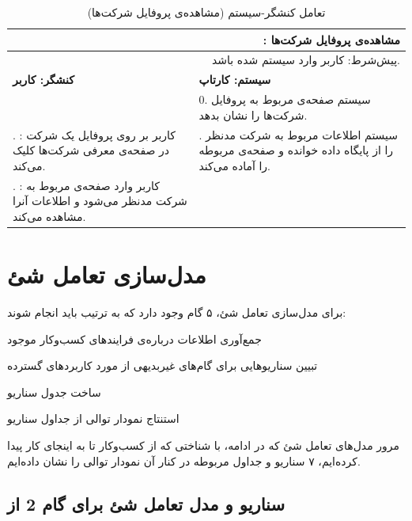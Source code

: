 \documentclass[12pt,svgnames,oneside]{book}
\newcounter{itemadded}
\let\LaTeXStandardEnumerateBegin\enumerate
\let\LaTeXStandardEnumerateEnd\endenumerate
\renewenvironment{enumerate}{%
\LaTeXStandardEnumerateBegin%
\setcounter{itemadded}{0}
}{%
\LaTeXStandardEnumerateEnd%
}%
\newcommand{\uc}[1]{\lr{UC{#1}}}
\newcommand{\tucbw}{\lr{TUCBW}}
\newcommand{\tucew}{\lr{TUCEW}}
\newcommand{\actorsystem}[1]{
\textbf{کنشگر: {#1}} &
\textbf{سیستم: کارتاپ} \\
}
\newcommand{\zerostep}[1]{
& 0. {#1} \\
}
\newcounter{UseCaseCounter}
\newcommand{\step}[1]{
\stepcounter{UseCaseCounter}\arabic{UseCaseCounter}. {#1}
}
\newcommand{\ucname}[2]{
\multicolumn{2}{|r|}{\uc{{#1}}: {#2}} \\
}
\newcommand{\preif}[1]{
\multicolumn{2}{|r|}{پیش‌شرط:‌ {#1}} \\
}
\begin{document}
\setcounter{UseCaseCounter}{0}
\begin{table}[H]
\caption{تعامل کنشگر-سیستم  (مشاهده‌ی پروفایل شرکت‌ها)}
\label{table:uc:company-profile}
\begin{center}
\begin{tabular}{|p{}|p{}|}
\hline

\ucname{13}{مشاهده‌ی پروفایل شرکت‌ها}
\hline

\preif{کاربر وارد سیستم شده باشد.}
\hline

\actorsystem{کاربر}
\hline

\zerostep{{\small سیستم صفحه‌ی مربوط به پروفایل شرکت‌ها را نشان بدهد.}}
\hline

\step{{\small \textbf{\tucbw}: کاربر بر روی پروفایل یک شرکت در صفحه‌ی معرفی شرکت‌ها کلیک می‌کند.}} & 
\step{{\small سیستم اطلاعات مربوط به شرکت مدنظر را از پایگاه داده خوانده و صفحه‌ی مربوطه را آماده می‌کند.}} \\
\hline

\step{{\small \textbf{\tucew}: کاربر وارد صفحه‌ی مربوط به شرکت مدنظر می‌شود و اطلاعات آنرا مشاهده می‌کند.}} & 
\\
\hline
\end{tabular}
\end{center}
\end{table}

\chapter{مدل‌سازی تعامل شئ}
برای مدل‌‌سازی تعامل شئ، ۵ گام وجود دارد که به ترتیب باید انجام شوند:
\begin{enumerate}
\item
جمع‌آوری اطلاعات درباره‌ی فرایند‌های کسب‌وکار موجود 
\item 
تبیین سناریو‌هایی برای گام‌های غیربدیهی از مورد کاربرد‌های گسترده
\item 
ساخت جدول سناریو
\item 
استنتاج نمودار توالی از جداول سناریو
\item 
مرور مدل‌های تعامل شئ
\end{enumerate}
که در ادامه، با شناختی که از کسب‌وکار تا به اینجای کار پیدا کرده‌ایم، ۷ سناریو و جداول مربوطه در کنار آن نمودار توالی را نشان داده‌ایم.

\clearpage
\section{سناریو و مدل تعامل شئ برای گام 2 از \uc{25}}
\end{document}
